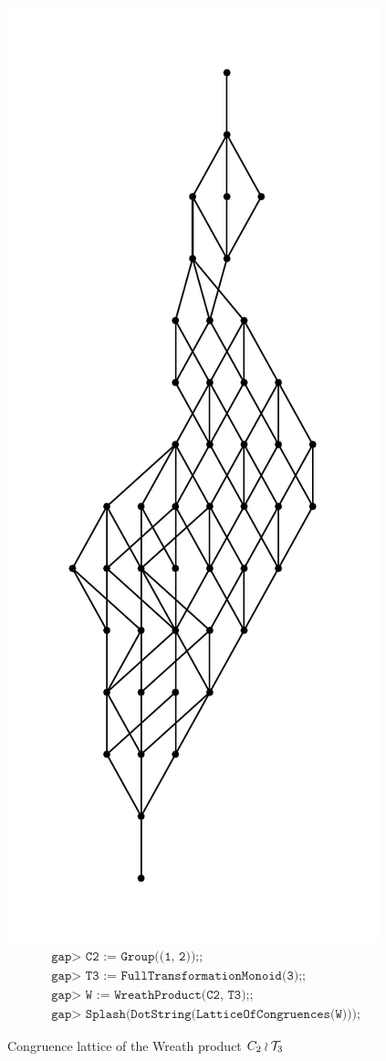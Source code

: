 \begin{figure}[h]
  \centering
  \includegraphics[height=0.9\textheight]{pics/ch-lattice/c2-wr-t3.pdf}
  \doublespacing
  \vspace{-1.5cm}
  \begin{align*}
    &\texttt{gap> C2 := Group((1, 2));;} \\
    &\texttt{gap> T3 := FullTransformationMonoid(3);;} \\
    &\texttt{gap> W := WreathProduct(C2, T3);;} \\
    &\texttt{gap> Splash(DotString(LatticeOfCongruences(W)));}
  \end{align*}
  \vspace{-1.0cm}
  \caption[Congruence lattice of the Wreath product $C_2 \wr \T_3$]
  {Congruence lattice of the Wreath product $C_2 \wr \T_3$
    \cite[\S10.1]{wreath}}
  \label{fig:c2-wr-t3-lattice}
\end{figure}


